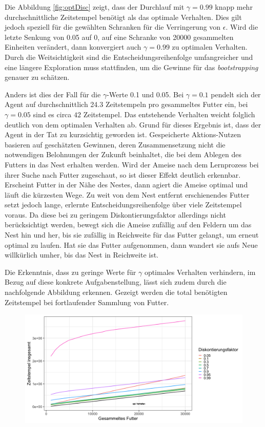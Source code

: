 \par 
Die Abbildung \ref{fig:optDisc} zeigt, dass der Durchlauf mit $\gamma = 0.99$ knapp mehr durchschnittliche Zeitstempel benötigt als das optimale Verhalten. Dies gilt jedoch speziell für die gewählten Schranken für die Verringerung von $\epsilon$. Wird die letzte Senkung von 0.05 auf 0, auf eine Schranke von 20000 gesammelten Einheiten verändert, dann konvergiert auch $\gamma = 0.99$ zu optimalen Verhalten. Durch die \glqq Weitsichtigkeit\grqq{} sind die Entscheidungsreihenfolge umfangreicher und eine längere Exploration muss stattfinden, um die Gewinne für das \textit{bootstrapping} genauer zu schätzen.
\par 
Anders ist dies der Fall für die $\gamma$-Werte 0.1 und 0.05. Bei $\gamma = 0.1$ pendelt sich der Agent auf durchschnittlich 24.3 Zeitstempeln pro gesammeltes Futter ein, bei $\gamma = 0.05$ sind es circa $42$ Zeitstempel. Das entstehende Verhalten weicht folglich deutlich von dem optimalen Verhalten ab. Grund für dieses Ergebnis ist, dass der Agent in der Tat zu \glqq kurzsichtig\grqq{} geworden ist. Gespeicherte Aktions-Nutzen basieren auf geschätzten Gewinnen, deren Zusammensetzung nicht die notwendigen Belohnungen der Zukunft beinhaltet, die bei dem Ablegen des Futters in das Nest erhalten werden. Wird der Ameise nach dem Lernprozess bei ihrer Suche nach Futter zugeschaut, so ist dieser Effekt deutlich erkennbar. Erscheint Futter in der Nähe des Nestes, dann agiert die Ameise optimal und läuft die kürzesten Wege. Zu weit von dem Nest entfernt erschienendes Futter setzt jedoch lange, erlernte Entscheidungsreihenfolge über viele Zeitstempel voraus. Da diese bei zu geringem Diskontierungsfaktor allerdings nicht berücksichtigt werden, bewegt sich die Ameise zufällig auf den Feldern um das Nest hin und her, bis sie zufällig in Reichweite für das Futter gelangt, um erneut optimal zu laufen. Hat sie das Futter aufgenommen, dann wandert sie aufs Neue willkürlich umher, bis das Nest in Reichweite ist.
\par 
Die Erkenntnis, dass zu geringe Werte für $\gamma$ optimales Verhalten verhindern, im Bezug auf diese konkrete Aufgabenstellung, lässt sich zudem durch die nachfolgende Abbildung erkennen. Gezeigt werden die total benötigten Zeitstempel bei fortlaufender Sammlung von Futter.
\begin{figure}[H]
    \centering
    \includegraphics[width=\textwidth]{images/optDiscTotalTS}
    \label{fig:test1}
\end{figure}
